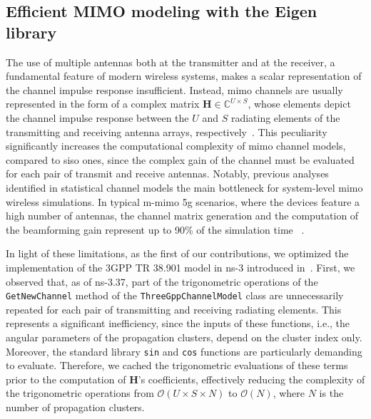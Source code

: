 
\subsection{Efficient MIMO modeling with the Eigen library}
\label{sec:opt_code}

The use of multiple antennas both at the transmitter and at the receiver, a fundamental feature of modern wireless systems, makes a scalar representation of the channel impulse response insufficient. Instead, \gls{mimo} channels are usually represented in the form of a complex matrix $\bm{H} \in \mathbb{C}^{U \times S}$, whose elements depict the channel impulse response between the $U$ and $S$ radiating elements of the transmitting and receiving antenna arrays, respectively~\cite{TR38901}. This peculiarity significantly increases the computational complexity of \gls{mimo} channel models, compared to \gls{siso} ones, since the complex gain of the channel must be evaluated for each pair of transmit and receive antennas.
Notably, previous analyses identified in statistical channel models the main bottleneck for system-level \gls{mimo} wireless simulations. In typical \gls{m-mimo} \gls{5g} scenarios, where the devices feature a high number of antennas, the channel matrix generation and the computation of the beamforming gain represent up to 90\% of the simulation time ~\cite{testolina2020scalable}. 

In light of these limitations, as the first of our contributions, we optimized the implementation of the 3GPP TR 38.901 model in ns-3 introduced in~\cite{tommaso:20}. 
First, we observed that, as of ns-3.37, part of the trigonometric operations of the \texttt{GetNewChannel} method of the \texttt{Three\-Gpp\-Channel\-Model} class are unnecessarily repeated for each pair of transmitting and receiving radiating elements. This represents a significant inefficiency, since the inputs of these functions, i.e., the angular parameters of the propagation clusters, depend on the cluster index only. Moreover, the standard library \texttt{sin} and \texttt{cos} functions are particularly demanding to evaluate. Therefore, we cached the trigonometric evaluations of these terms prior to the computation of $\bm{H}$'s coefficients, effectively reducing the complexity of the trigonometric operations from $\mathcal{O}(U \times S \times N)$ to $\mathcal{O}(N)$, where $N$ is the number of propagation clusters. 

